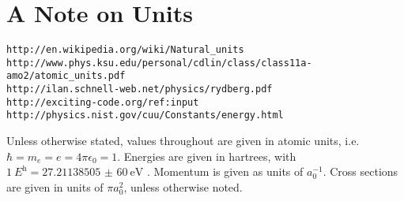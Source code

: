\documentclass[Introduction.tex]{subfiles}
\begin{document}
\section{A Note on Units}
\label{sec:Units}

\begin{verbatim}
http://en.wikipedia.org/wiki/Natural_units
http://www.phys.ksu.edu/personal/cdlin/class/class11a-amo2/atomic_units.pdf
http://ilan.schnell-web.net/physics/rydberg.pdf
http://exciting-code.org/ref:input
http://physics.nist.gov/cuu/Constants/energy.html
\end{verbatim}

Unless otherwise stated, values throughout are given in atomic units, i.e. $\hbar = m_e = e = 4\pi\epsilon_0 = 1$. Energies are given in hartrees, with $\SI{1}{\hartree} = \SI{27.211 385 05(60)}{\electronvolt}$ \cite{Mohr2012,NISTConversions}. Momentum is given as units of $a_0^{-1}$. Cross sections are given in units of $\pi a_0^2$, unless otherwise noted.
\end{document}
